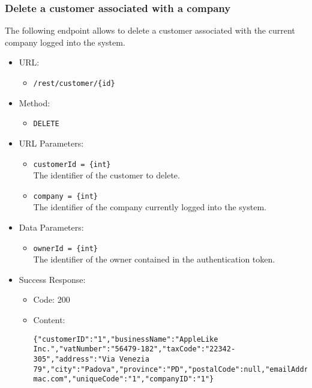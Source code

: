 \newpage
\subsubsection*{Delete a customer associated with a company}

The following endpoint allows to delete a customer associated with the current company logged into the system.

\begin{itemize}

    \item URL:
    \begin{itemize}
        \item \texttt{/rest/customer/\{id\}}
    \end{itemize}

    \item Method:
    \begin{itemize}
        \item \texttt{DELETE}
    \end{itemize}

    \item URL Parameters:
    \begin{itemize}
        \item \texttt{customerId = \{int\}} \\
        The identifier of the customer to delete.
        \item \texttt{company = \{int\}} \\
        The identifier of the company currently logged into the system.
    \end{itemize}

    \item Data Parameters:
    \begin{itemize}
        \item \texttt{ownerId = \{int\}} \\
        The identifier of the owner contained in the authentication token.
    \end{itemize}

    \item Success Response:
    \begin{itemize}
        \item Code: 200
        \item Content:
        \begin{lstlisting}
{"customerID":"1","businessName":"AppleLike Inc.","vatNumber":"56479-182","taxCode":"22342-305","address":"Via Venezia 79","city":"Padova","province":"PD","postalCode":null,"emailAddress":"applelike@google.com","pec":"applelike@pec-mac.com","uniqueCode":"1","companyID":"1"}
        \end{lstlisting}
    \end{itemize}


\end{itemize}
